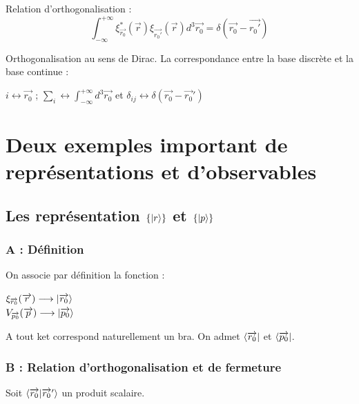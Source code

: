 \documentclass[12pt,a4paper,titlepage]{book}
\begin{document}
Relation d'orthogonalisation :
\begin{equation*}
\int_{- \infty}^{+ \infty} \xi_{\overrightarrow{r_0}}^* (\overrightarrow{r}) \xi_{\overrightarrow{r_0 '}} (\overrightarrow{r}) d^3 \overrightarrow{r_0} = \delta (\overrightarrow{r_0} - \overrightarrow{r_0 '})
\end{equation*}

Orthogonalisation au sens de Dirac. La correspondance entre la base discrète et la base continue :
\begin{center}
$i \longleftrightarrow \overrightarrow{r_0}$ ; $\sum\limits_i \longleftrightarrow \int_{- \infty}^{+ \infty} d^3 \overrightarrow{r_0}$ et $\delta_{ij} \longleftrightarrow \delta (\overrightarrow{r_0}-\overrightarrow{r_0}')$
\end{center}

\section{Deux exemples important de représentations et d'observables}

\subsection{Les représentation $\lbrace \ket r \rbrace$ et $\lbrace \ket p \rbrace$}

\subsubsection{A : Définition}

On associe par définition la fonction :
\begin{center}
$\xi_{\overrightarrow{r_0}} (\overrightarrow{r}) \longrightarrow \ket{\overrightarrow{r_0}}$\\
$V_{\overrightarrow{p_0}} (\overrightarrow{p}) \longrightarrow \ket{\overrightarrow{p_0}}$
\end{center}
A tout ket correspond naturellement un bra. On admet $\bra{\overrightarrow{r_0}}$ et $\bra{\overrightarrow{p_0}}$.

\subsubsection{B : Relation d'orthogonalisation et de fermeture}

Soit $\braket{\overrightarrow{r_0} \vert \overrightarrow{r_0}'}$ un produit scalaire.
\end{document}
